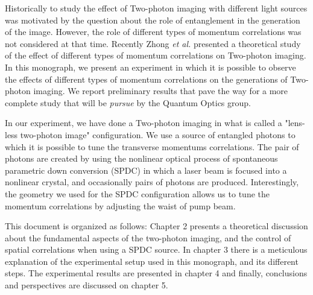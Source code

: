 Historically to study the effect of Two-photon imaging with different light sources was motivated by the question about the role of 
entanglement in the generation of the image. However, the role of different types of momentum correlations was not considered at that time. 
Recently Zhong \textit{et al.} presented a theoretical study of the effect of different types of momentum correlations on 
Two-photon imaging\cite{zhong}. In this monograph, we present an experiment in which it is possible to observe the effects of 
different types of momentum correlations on the generations of Two-photon imaging. We report preliminary results that pave the way for a more complete
study that will be \textit{pursue} by the Quantum Optics group.
 

In our experiment, we have done a Two-photon imaging in what is called a "lens-less two-photon image" configuration\cite{lensless}. We use a source of entangled 
photons to which it is possible to tune the transverse momentums
 correlations. The pair of photons are created by using the nonlinear optical process of spontaneous parametric down conversion (SPDC) in which 
a laser beam is focused into a nonlinear crystal, and occasionally pairs of photons are produced.  Interestingly, the geometry we used for the SPDC configuration
allows us to tune the momentum correlations by adjusting the waist of pump beam\cite{omar}.






This document is organized as follows: Chapter 2 presents a theoretical discussion about the fundamental 
aspects of the two-photon imaging, and the control of spatial correlations when using a SPDC source.  
In chapter 3 there is a meticulous explanation of the experimental setup used in this monograph, and its different steps.
The experimental results are presented in chapter 4 and finally, conclusions and perspectives are discussed on chapter 5.

